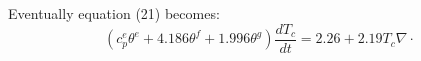 Eventually equation (21) becomes:
\begin{equation}
(c_p^e \theta^e + 4.186 \theta^f + 1.996 \theta^g) \frac{dT_c}{dt} = 2.26 + 2.19 T_c \nabla \cdot 
\end{equation}
